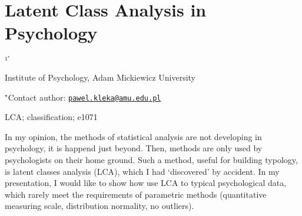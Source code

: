 \documentclass[\main/boa.tex]{subfiles}
\begin{document}
\section{Latent Class Analysis in Psychology}

\begin{center}
  {\bf {}$^{1^\star}$}
\end{center}

\vskip 0.3cm

\begin{affiliations}
\begin{enumerate}
\begin{minipage}{0.915\textwidth}
\centering
\item Institute of Psychology, Adam Mickiewicz University \\[-2pt]
\end{minipage}
\end{enumerate}
$^\star$Contact author: \href{mailto:pawel.kleka@amu.edu.pl}{\nolinkurl{pawel.kleka@amu.edu.pl}}\\
\end{affiliations}

\vskip 0.5cm

\begin{minipage}{0.915\textwidth}
\keywords LCA; classification;
\packages e1071
\end{minipage}

\vskip 0.8cm

In my opinion, the methods of statistical analysis are not developing in
psychology, it is happend just beyond. Then, methods are only used by
psychologists on their home ground. Such a method, useful for building
typology, is latent classes analysis (LCA), which I had `discovered' by
accident. In my presentation, I would like to show how use LCA to
typical psychological data, which rarely meet the requirements of
parametric methods (quantitative measuring scale, distribution
normality, no outliers).
\end{document}
